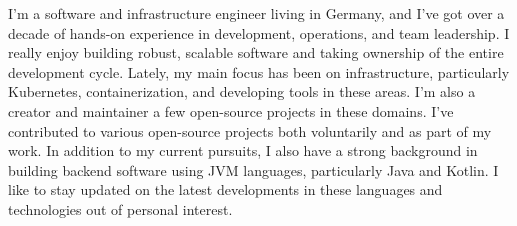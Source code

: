 
\begin{cvparagraph}

    I'm a software and infrastructure engineer living in Germany,
    and I've got over a decade of hands-on experience in development, operations, and team leadership.
    \newline
    I really enjoy building robust, scalable software and taking ownership of the entire development cycle.
    \newline
    Lately, my main focus has been on infrastructure, particularly Kubernetes, containerization,
    and developing tools in these areas.
    I'm also a creator and maintainer a few open-source projects in these domains.
    \newline
    I've contributed to various open-source projects both voluntarily and as part of my work.
    \newline
    In addition to my current pursuits, I also have a strong background
    in building backend software using JVM languages, particularly Java and Kotlin.
    I like to stay updated on the latest developments in these languages
    and technologies out of personal interest.

\end{cvparagraph}
